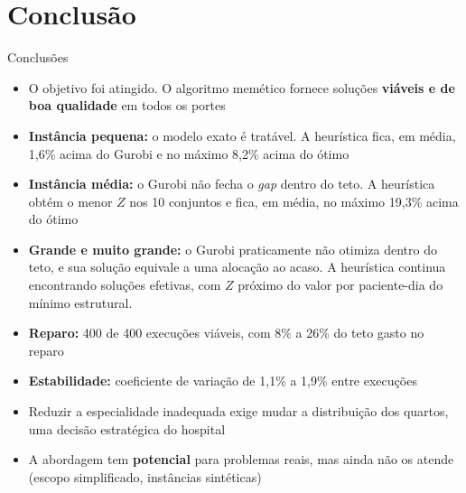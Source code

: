 \documentclass[aspectratio=169,10pt]{beamer}
\newcommand{\framerefs}{}
\newcommand{\slidecites}[1]{\gdef\framerefs{Referências: \cite{#1}}}
\gdef\framerefs{}%
\begin{document}
\section{Conclusão}

\begin{frame}{Conclusões}
    \slidecites{ceschia2012modeling, ceschia2011local, demeester2010hybrid}
    \begin{itemize}\setlength{\itemsep}{6pt}
        \item O objetivo foi atingido. O algoritmo memético fornece soluções \textbf{viáveis e de boa qualidade} em todos os portes
        \item \textbf{Instância pequena:} o modelo exato é tratável. A heurística fica, em média, 1,6\% acima do Gurobi e no máximo 8,2\% acima do ótimo
        \item \textbf{Instância média:} o Gurobi não fecha o \textit{gap} dentro do teto. A heurística obtém o menor $Z$ nos 10 conjuntos e fica, em média, no máximo 19,3\% acima do ótimo
        \item \textbf{Grande e muito grande:} o Gurobi praticamente não otimiza dentro do teto, e sua solução equivale a uma alocação ao acaso. A heurística continua encontrando soluções efetivas, com $Z$ próximo do valor por paciente-dia do mínimo estrutural.
        \item \textbf{Reparo:} 400 de 400 execuções viáveis, com 8\% a 26\% do teto gasto no reparo
        \item \textbf{Estabilidade:} coeficiente de variação de 1,1\% a 1,9\% entre execuções
        \item Reduzir a especialidade inadequada exige mudar a distribuição dos quartos, uma decisão estratégica do hospital
        \item A abordagem tem \textbf{potencial} para problemas reais, mas ainda não os atende (escopo simplificado, instâncias sintéticas)
    \end{itemize}
\end{frame}
\end{document}
